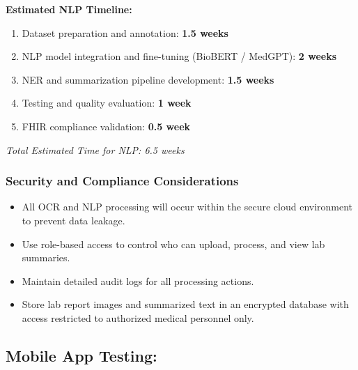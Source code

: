 \documentclass[a4paper, 12pt]{article}
\begin{document}
\textbf{Estimated NLP Timeline:}
\begin{enumerate}
    \item Dataset preparation and annotation: \textbf{1.5 weeks}
    \item NLP model integration and fine-tuning (BioBERT / MedGPT): \textbf{2 weeks}
    \item NER and summarization pipeline development: \textbf{1.5 weeks}
    \item Testing and quality evaluation: \textbf{1 week}
    \item FHIR compliance validation: \textbf{0.5 week}
\end{enumerate}
\textit{Total Estimated Time for NLP: 6.5 weeks}

\subsubsection{Security and Compliance Considerations}
\begin{itemize}
    \item All OCR and NLP processing will occur within the secure cloud environment to prevent data leakage.
    \item Use role-based access to control who can upload, process, and view lab summaries.
    \item Maintain detailed audit logs for all processing actions.
    \item Store lab report images and summarized text in an encrypted database with access restricted to authorized medical personnel only.
\end{itemize}

\subsection{Mobile App Testing:}
\end{document}
